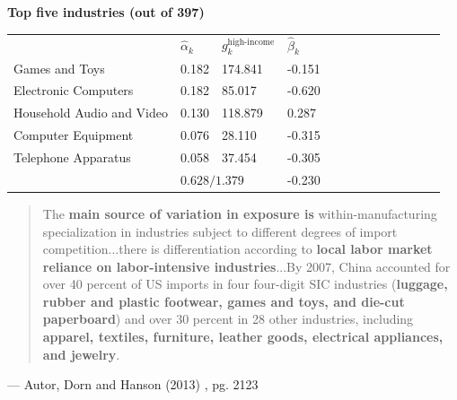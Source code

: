 \documentclass[notes,11pt, aspectratio=169]{beamer}
\begin{document}
\begin{frame}[label=top5weights]
\textbf{Top five industries (out of 397)}



\begin{center}
\begin{tabular}{lllllllllllll}
\toprule
& $\hat{\alpha}_k$ & $g_k^{\text{high-income}}$ & $\hat{\beta}_k$  \\ \cmidrule(lr){2-4} 
Games and Toys & 0.182 & 174.841 & -0.151  \\  
Electronic Computers & 0.182 & 85.017 & -0.620  \\ 
Household Audio and Video & 0.130 & 118.879 & 0.287  \\ 
Computer Equipment & 0.076 & 28.110 & -0.315  \\ 
Telephone Apparatus & 0.058 & 37.454 & -0.305  \\ 
\bottomrule 
& \multicolumn{2}{l}{$0.628 \big/ 1.379$}   & -0.230 &\\
\end{tabular}
\end{center}
  
\footnotesize
\medskip
\begin{quote}
The \textbf{main source of variation in exposure is} within-manufacturing specialization in industries subject to different degrees of import competition...there is differentiation according to \textbf{local labor market reliance on labor-intensive industries}...By 2007, China accounted for over 40 percent of US imports in four four-digit SIC industries (\textbf{luggage, rubber and plastic footwear, games and toys, and die-cut paperboard}) and over 30 percent in 28 other industries, including \textbf{apparel, textiles, furniture, leather goods, electrical appliances, and jewelry}.
\end{quote}
\begin{center}
--- Autor, Dorn and Hanson (2013) , pg. 2123
\end{center}
\hyperlink{correlmatrix}{} 
\end{frame}
\end{document}
